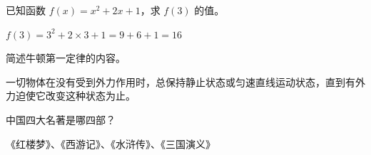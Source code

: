\begin{question}
已知函数 $f(x) = x^2 + 2x + 1$，求 $f(3)$ 的值。
\end{question}
\begin{answer}
$f(3) = 3^2 + 2 \times 3 + 1 = 9 + 6 + 1 = 16$
\end{answer}

\begin{question}
简述牛顿第一定律的内容。
\end{question}
\begin{answer}
一切物体在没有受到外力作用时，总保持静止状态或匀速直线运动状态，直到有外力迫使它改变这种状态为止。
\end{answer}

\begin{question}
中国四大名著是哪四部？
\end{question}
\begin{answer}
《红楼梦》、《西游记》、《水浒传》、《三国演义》
\end{answer}

